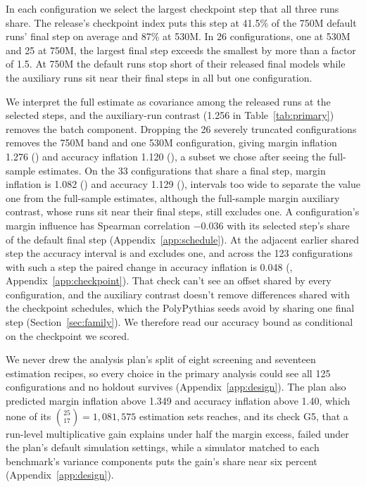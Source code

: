 In each configuration we select the largest checkpoint step that all three runs share. The release's checkpoint index puts this step at 41.5\% of the 750M default runs' final step on average and 87\% at 530M. In 26 configurations, one at 530M and 25 at 750M, the largest final step exceeds the smallest by more than a factor of 1.5. At 750M the default runs stop short of their released final models while the auxiliary runs sit near their final steps in all but one configuration.

We interpret the full estimate as covariance among the released runs at the selected steps, and the auxiliary-run contrast (1.256 in Table~\ref{tab:primary}) removes the batch component. Dropping the 26 severely truncated configurations removes the 750M band and one 530M configuration, giving margin inflation 1.276 () and accuracy inflation 1.120 (), a subset we chose after seeing the full-sample estimates. On the 33 configurations that share a final step, margin inflation is 1.082 () and accuracy 1.129 (), intervals too wide to separate the value one from the full-sample estimates, although the full-sample margin auxiliary contrast, whose runs sit near their final steps, still excludes one. A configuration's margin influence has Spearman correlation $-0.036$ with its selected step's share of the default final step (Appendix~\ref{app:schedule}). At the adjacent earlier shared step the accuracy interval is  and excludes one, and across the 123 configurations with such a step the paired change in accuracy inflation is 0.048 (, Appendix~\ref{app:checkpoint}). That check can't see an offset shared by every configuration, and the auxiliary contrast doesn't remove differences shared with the checkpoint schedules, which the PolyPythias seeds avoid by sharing one final step (Section~\ref{sec:family}). We therefore read our accuracy bound as conditional on the checkpoint we scored.

We never drew the analysis plan's split of eight screening and seventeen estimation recipes, so every choice in the primary analysis could see all 125 configurations and no holdout survives (Appendix~\ref{app:design}). The plan also predicted margin inflation above 1.349 and accuracy inflation above 1.40, which none of its $\binom{25}{17}=1{,}081{,}575$ estimation sets reaches, and its check G5, that a run-level multiplicative gain explains under half the margin excess, failed under the plan's default simulation settings, while a simulator matched to each benchmark's variance components puts the gain's share near six percent (Appendix~\ref{app:design}).

